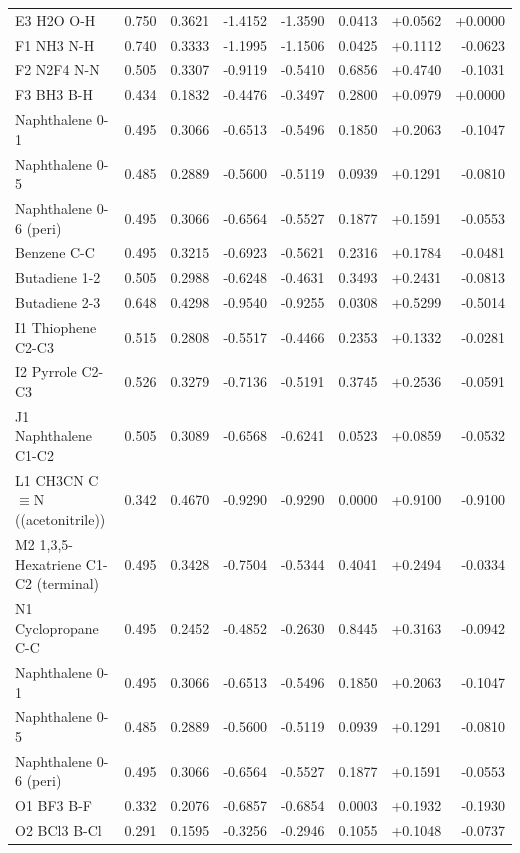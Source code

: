 \documentclass[11pt,a4paper]{article}
\begin{document}
\begin{longtable}{p{4.5cm}rrrrrrr}
E3 H2O O-H & 0.750 & 0.3621 & -1.4152 & -1.3590 & 0.0413 & +0.0562 & +0.0000\\
F1 NH3 N-H & 0.740 & 0.3333 & -1.1995 & -1.1506 & 0.0425 & +0.1112 & -0.0623\\
F2 N2F4 N-N & 0.505 & 0.3307 & -0.9119 & -0.5410 & 0.6856 & +0.4740 & -0.1031\\
F3 BH3 B-H & 0.434 & 0.1832 & -0.4476 & -0.3497 & 0.2800 & +0.0979 & +0.0000\\
Naphthalene 0-1 & 0.495 & 0.3066 & -0.6513 & -0.5496 & 0.1850 & +0.2063 & -0.1047\\
Naphthalene 0-5 & 0.485 & 0.2889 & -0.5600 & -0.5119 & 0.0939 & +0.1291 & -0.0810\\
Naphthalene 0-6 (peri) & 0.495 & 0.3066 & -0.6564 & -0.5527 & 0.1877 & +0.1591 & -0.0553\\
Benzene C-C & 0.495 & 0.3215 & -0.6923 & -0.5621 & 0.2316 & +0.1784 & -0.0481\\
Butadiene 1-2 & 0.505 & 0.2988 & -0.6248 & -0.4631 & 0.3493 & +0.2431 & -0.0813\\
Butadiene 2-3 & 0.648 & 0.4298 & -0.9540 & -0.9255 & 0.0308 & +0.5299 & -0.5014\\
I1 Thiophene C2-C3 & 0.515 & 0.2808 & -0.5517 & -0.4466 & 0.2353 & +0.1332 & -0.0281\\
I2 Pyrrole C2-C3 & 0.526 & 0.3279 & -0.7136 & -0.5191 & 0.3745 & +0.2536 & -0.0591\\
J1 Naphthalene C1-C2 & 0.505 & 0.3089 & -0.6568 & -0.6241 & 0.0523 & +0.0859 & -0.0532\\
L1 CH3CN C$\equiv$N ((acetonitrile)) & 0.342 & 0.4670 & -0.9290 & -0.9290 & 0.0000 & +0.9100 & -0.9100\\
M2 1,3,5-Hexatriene C1-C2 (terminal) & 0.495 & 0.3428 & -0.7504 & -0.5344 & 0.4041 & +0.2494 & -0.0334\\
N1 Cyclopropane C-C & 0.495 & 0.2452 & -0.4852 & -0.2630 & 0.8445 & +0.3163 & -0.0942\\
Naphthalene 0-1 & 0.495 & 0.3066 & -0.6513 & -0.5496 & 0.1850 & +0.2063 & -0.1047\\
Naphthalene 0-5 & 0.485 & 0.2889 & -0.5600 & -0.5119 & 0.0939 & +0.1291 & -0.0810\\
Naphthalene 0-6 (peri) & 0.495 & 0.3066 & -0.6564 & -0.5527 & 0.1877 & +0.1591 & -0.0553\\
O1 BF3 B-F & 0.332 & 0.2076 & -0.6857 & -0.6854 & 0.0003 & +0.1932 & -0.1930\\
O2 BCl3 B-Cl & 0.291 & 0.1595 & -0.3256 & -0.2946 & 0.1055 & +0.1048 & -0.0737\\

\end{longtable}
\end{document}
